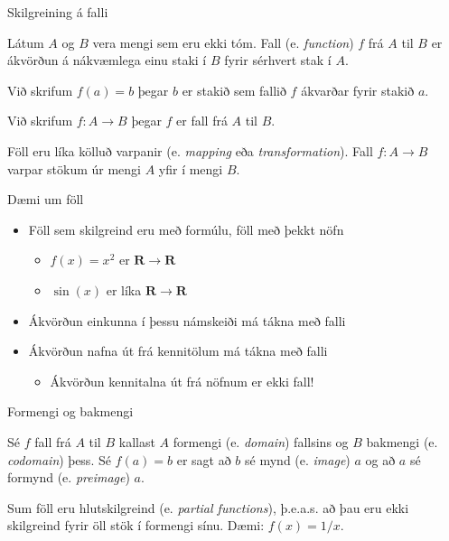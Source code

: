 \documentclass[handout]{beamer}
\begin{document}
\begin{frame}{Skilgreining á falli}
\begin{tcolorbox}[title=Fall]
Látum $A$ og $B$ vera mengi sem eru ekki tóm. Fall (e. \emph{function}) $f$ frá $A$ til $B$ er ákvörðun á nákvæmlega einu staki í $B$ fyrir sérhvert stak í $A$.

Við skrifum $f(a) = b$ þegar $b$ er stakið sem fallið $f$ ákvarðar fyrir stakið $a$.

Við skrifum $f: A \to B$ þegar $f$ er fall frá $A$ til $B$.
\end{tcolorbox}

Föll eru líka kölluð varpanir (e. \emph{mapping} eða \emph{transformation}). Fall $f: A \to B$ varpar stökum úr mengi $A$ yfir í mengi $B$.
\end{frame}

\begin{frame}{Dæmi um föll}
\begin{itemize}
 \item Föll sem skilgreind eru með formúlu, föll með þekkt nöfn
 \begin{itemize}
  \item $f(x) = x^2$ er $\mathbf{R} \to \mathbf{R}$
  \item $\sin(x)$ er líka $\mathbf{R} \to \mathbf{R}$
 \end{itemize}
 \item Ákvörðun einkunna í þessu námskeiði má tákna með falli
 \item Ákvörðun nafna út frá kennitölum má tákna með falli \pause
 \begin{itemize}
  \item Ákvörðun kennitalna út frá nöfnum er ekki fall!
 \end{itemize}
\end{itemize}
\end{frame}

\begin{frame}{Formengi og bakmengi}
\begin{tcolorbox}[title=Formengi og bakmengi]
Sé $f$ fall frá $A$ til $B$ kallast $A$ formengi (e. \emph{domain}) fallsins og $B$ bakmengi (e. \emph{codomain}) þess. Sé $f(a) = b$ er sagt að $b$ sé mynd (e. \emph{image}) $a$ og að $a$ sé formynd (e. \emph{preimage}) $a$.
\end{tcolorbox}
Sum föll eru hlutskilgreind (e. \emph{partial functions}), þ.e.a.s. að þau eru ekki skilgreind fyrir öll stök í formengi sínu. Dæmi: $f(x) = 1/x$.
\end{frame}
\end{document}
